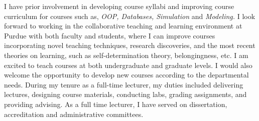 \documentclass[10pt]{article}
\renewcommand*\paragraph[1]{}
\begin{document}
\paragraph{curriculum development for lecture and lab courses in Computer Science/Data Science}
I have prior involvement in developing course syllabi and improving course curriculum for courses such as, \textit{OOP, Databases, Simulation} and \textit{Modeling.}
I look forward to working in the collaborative teaching and learning environment at Purdue with both faculty and students, where I can improve courses incorporating novel teaching  techniques, research discoveries, and the most recent theories on learning, such as self-determination theory, belongingness, etc. 
I am excited to teach courses at both undergraduate and graduate levels. 
I would also welcome the opportunity to develop new courses according to the departmental needs.
During my tenure as a full-time
lecturer, my duties included delivering lectures, designing course materials, conducting labs, grading assignments,
and providing advising. As a full time lecturer, I have served on
dissertation, accreditation and administrative committees.

\paragraph{interdiscipliniary colab}

\paragraph{P4) The ability to contribute through teaching and/or service to the diversity, cultural sensitivity, and excellence of the academic community.}
\end{document}
